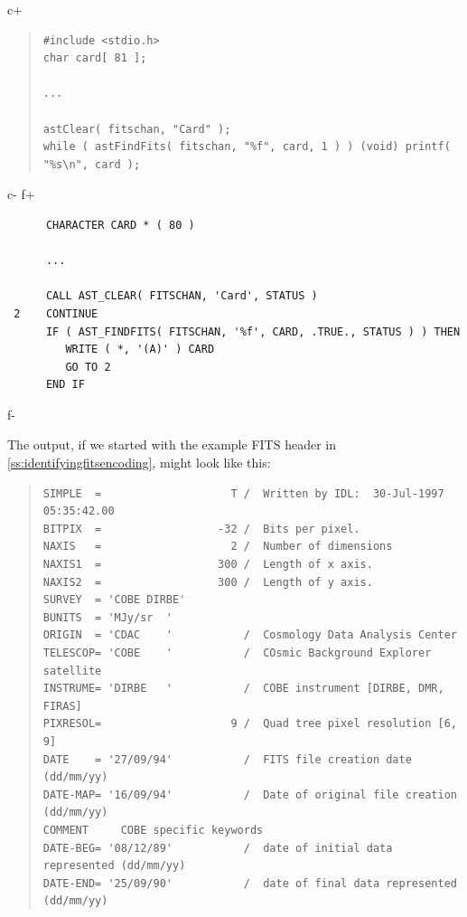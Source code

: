 \documentclass[twoside,11pt]{article}
\newcommand{\secref}[1]{\S\ref{#1}}
\renewcommand{\secref}[1]{\ref{#1}}
\begin{document}
c+
\begin{quote}
\small
\begin{verbatim}
#include <stdio.h>
char card[ 81 ];

...

astClear( fitschan, "Card" );
while ( astFindFits( fitschan, "%f", card, 1 ) ) (void) printf( "%s\n", card );
\end{verbatim}
\normalsize
\end{quote}
c-
f+
\small
\begin{verbatim}
      CHARACTER CARD * ( 80 )

      ...

      CALL AST_CLEAR( FITSCHAN, 'Card', STATUS )
 2    CONTINUE
      IF ( AST_FINDFITS( FITSCHAN, '%f', CARD, .TRUE., STATUS ) ) THEN
         WRITE ( *, '(A)' ) CARD
         GO TO 2
      END IF
\end{verbatim}
\normalsize
f-

The output, if we started with the example FITS header in
\secref{ss:identifyingfitsencoding}, might look like this:

\begin{quote}
\small
\begin{verbatim}
SIMPLE  =                    T /  Written by IDL:  30-Jul-1997 05:35:42.00      
BITPIX  =                  -32 /  Bits per pixel.                               
NAXIS   =                    2 /  Number of dimensions                          
NAXIS1  =                  300 /  Length of x axis.                             
NAXIS2  =                  300 /  Length of y axis.                             
SURVEY  = 'COBE DIRBE'                                                          
BUNITS  = 'MJy/sr  '                                                            
ORIGIN  = 'CDAC    '           /  Cosmology Data Analysis Center                
TELESCOP= 'COBE    '           /  COsmic Background Explorer satellite          
INSTRUME= 'DIRBE   '           /  COBE instrument [DIRBE, DMR, FIRAS]           
PIXRESOL=                    9 /  Quad tree pixel resolution [6, 9]             
DATE    = '27/09/94'           /  FITS file creation date (dd/mm/yy)            
DATE-MAP= '16/09/94'           /  Date of original file creation (dd/mm/yy)     
COMMENT     COBE specific keywords                                              
DATE-BEG= '08/12/89'           /  date of initial data represented (dd/mm/yy)   
DATE-END= '25/09/90'           /  date of final data represented   (dd/mm/yy)   
\end{verbatim}
\normalsize
\end{quote}
\end{document}
